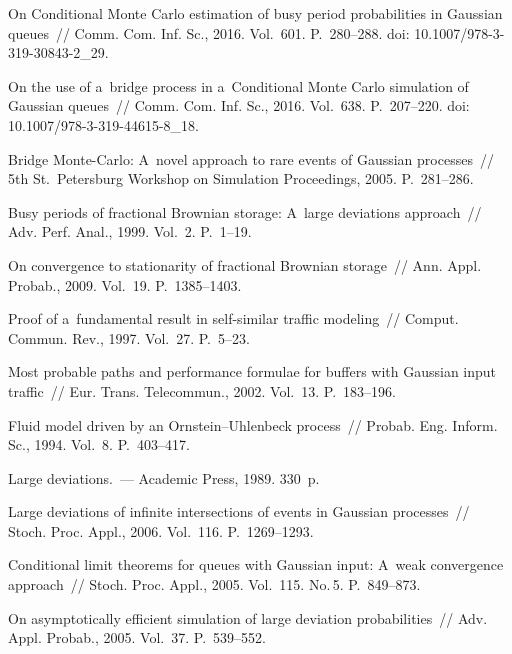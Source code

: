 \begin{multicols}{2}
{{\begin{thebibliography}{99}
 On 
Conditional Monte Carlo estimation of busy period probabilities in Gaussian queues~// 
Comm. Com. Inf. Sc., 2016. Vol.~601. P.~280--288. 
doi: 10.1007/978-3-319-30843-2\_29.

 On the use of a~bridge process 
in a~Conditional Monte Carlo simulation of Gaussian queues~// 
Comm. Com. Inf. Sc., 2016. Vol.~638. P.~207--220. 
doi: 10.1007/978-3-319-44615-8\_18.

Bridge Monte-Carlo: A~novel approach to rare events of Gaussian processes~// 
5th St.\ Petersburg Workshop on Simulation Proceedings, 2005. P.~281--286.



 Busy periods of fractional Brownian storage: 
A~large deviations approach~// Adv. Perf. Anal., 1999. Vol.~2. P.~1--19.

On convergence to stationarity of fractional Brownian storage~// 
Ann. Appl. Probab., 2009. Vol.~19. P.~1385--1403.

Proof of a~fundamental result in self-similar traffic modeling~// 
Comput. Commun. Rev., 1997. Vol.~27. P.~5--23.

Most probable paths and performance formulae for buffers with Gaussian input traffic~// 
Eur. Trans. Telecommun., 2002. Vol.~13. P.~183--196.

Fluid model driven by an Ornstein--Uhlenbeck process~// 
Probab. Eng. Inform. Sc., 1994. Vol.~8. P.~403--417.

 Large deviations.~--- Academic Press, 1989. 330~p.

Large deviations of infinite intersections of events in Gaussian processes~// 
Stoch. Proc. Appl., 2006. Vol.~116. P.~1269--1293.

 Conditional limit theorems for queues with Gaussian input: 
A~weak convergence approach~// Stoch. Proc. Appl., 2005. 
Vol.~115. No.\,5. P.~849--873.

On asymptotically efficient simulation of large deviation probabilities~// 
Adv. \mbox{Appl.} Probab., 2005. Vol.~37. P.~539--552.


\end{thebibliography}}}
\end{multicols}

